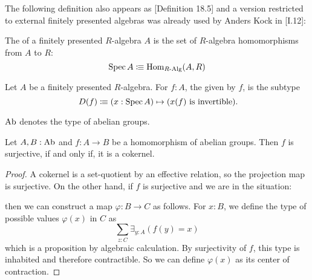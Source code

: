 The following definition also appears as \cite{ingo-thesis}[Definition 18.5]
and a version restricted to external finitely presented algebras was already used by Anders Kock in \cite{kock-sdg}[I.12]:

\begin{definition}
  \label{spec}
  The  of a finitely presented $R$-algebra $A$
  is the set of $R$-algebra homomorphisms from $A$ to $R$:
  \[ \operatorname{Spec} A \vcentcolon\mspace{-1.2mu}\equiv \mathrm{Hom}_{R\text{-}\mathrm{Alg}}(A, R) \]
\end{definition}

\begin{definition}%
  \label{standard-open-subset}
  Let $A$ be a finitely presented $R$-algebra.
  For $f:A$, the  given by $f$,
  is the subtype 
  \[
    D(f)\colonequiv (x:\Spec A)\mapsto (x(f)\text{ is invertible})
    \rlap{.}
  \]
\end{definition}

\begin{definition}
  $\AbGroup$\index{$\AbGroup$} denotes the type of abelian groups.
\end{definition}

\begin{lemma}%
  \label{surjective-abgroup-hom-is-cokernel}
  Let $A,B:\operatorname{Ab}$ and $f:A\to B$ be a homomorphism of abelian groups.
  Then $f$ is surjective, if and only if, it is a cokernel.
\end{lemma}

\begin{proof}
  A cokernel is a set-quotient by an effective relation,
  so the projection map is surjective.
  On the other hand, if $f$ is surjective and we are in the situation:
  \begin{center}
  \end{center}
  then we can construct a map $\varphi:B\to C$ as follows.
  For $x:B$, we define the type of possible values $\varphi(x)$ in $C$ as
  \[
    \sum_{z:C}\exists_{y:A}(f(y)=x)
  \]
  which is a proposition by algebraic calculation.
  By surjectivity of $f$, this type is inhabited and therefore contractible.
  So we can define $\varphi(x)$ as its center of contraction.
\end{proof}

